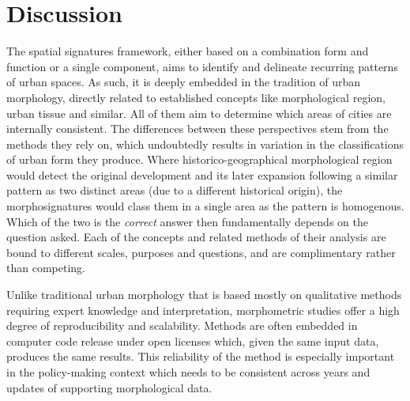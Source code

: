 \section{Discussion}
\label{sec:disc}

The spatial signatures framework, either based on a combination form and function or a
single component, aims to identify and delineate recurring patterns of urban
spaces. As
such, it is deeply embedded in the tradition of urban morphology, directly related to
established concepts like morphological region, urban tissue and similar. All
of them aim to
determine which areas of cities are internally consistent. The differences
between these perspectives stem from the methods they rely on, which
undoubtedly results in variation in the classifications of urban form they
produce. Where
historico-geographical morphological region would detect the original development and its later
expansion following a similar pattern as two distinct areas (due to a different
historical origin), the morphosignatures would class them in a single area as the pattern
is homogenous. Which of the two is the \textit{correct} answer then fundamentally
depends on the question asked. Each of the concepts and related methods of their
analysis are bound to different scales, purposes and questions, and are complimentary
rather than competing.


Unlike traditional urban morphology that is based mostly on qualitative methods requiring 
 expert knowledge and interpretation, morphometric studies offer a high
degree of reproducibility and scalability. Methods are often embedded in
computer code release under open licenses which, given the same input data,
produces the same results. This reliability of the method is especially
important in the policy-making context which needs to be consistent across years and
updates of supporting morphological data.


